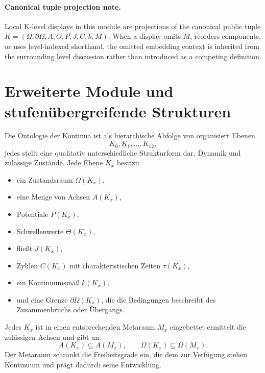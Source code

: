 


\paragraph{Canonical tuple projection note.}
Local K-level displays in this module are projections of the canonical public tuple \(K=(\Omega,\partial\Omega,A,\Theta,P,J,C,k,M)\). When a display omits \(M\), reorders components, or uses level-indexed shorthand, the omitted embedding context is inherited from the surrounding level discussion rather than introduced as a competing definition.

\section{Erweiterte Module und stufenübergreifende Strukturen}
\label{sec:klevels-master}

Die Ontologie der Kontinua ist als hierarchische Abfolge von organisiert
Ebenen
\[
K_0, K_1, \dots, K_{12},
\]
jedes stellt eine qualitativ unterschiedliche Strukturform dar,
Dynamik und zulässige Zustände.
Jede Ebene $K_x$ besitzt:
\begin{itemize}
    \item ein Zustandsraum $\Omega(K_x)$,
    \item eine Menge von Achsen $A(K_x)$,
    \item Potentiale $P(K_x)$,
    \item Schwellenwerte $\Theta(K_x)$,
    \item fließt $J(K_x)$,
    \item Zyklen $C(K_x)$ mit charakteristischen Zeiten $\tau(K_x)$,
    \item ein Kontinuumsmaß $k(K_x)$,
    \item und eine Grenze $\partial\Omega(K_x)$, die die Bedingungen beschreibt
          des Zusammenbruchs oder Übergangs.
\end{itemize}

Jedes $K_x$ ist in einen entsprechenden Metaraum $M_x$ eingebettet
ermittelt die zulässigen Achsen und gibt an:
\[
A(K_x) \subseteq A(M_x), \qquad
\Omega(K_x) \subseteq \Omega(M_x).
\]
Der Metaraum schränkt die Freiheitsgrade ein, die dem zur Verfügung stehen
Kontinuum und prägt dadurch seine Entwicklung.


